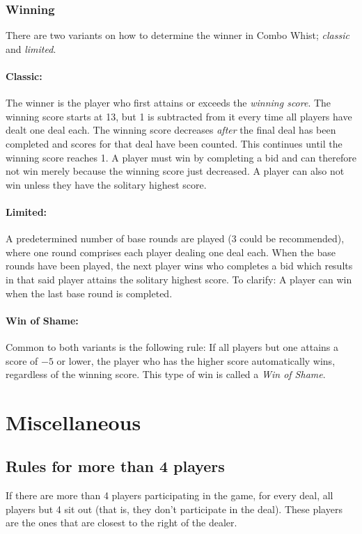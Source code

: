 \documentclass[a4paper]{article}
\begin{document}
			\subsubsection{Winning}
				\label{sec:winning}
				There are two variants on how to determine the winner in Combo Whist; \emph{classic} and \emph{limited}.

				\paragraph{Classic:}
				The winner is the player who first attains or exceeds the \emph{winning score}. The winning score starts at 13, but 1 is subtracted from it every time all players have dealt one deal each. The winning score decreases \emph{after} the final deal has been completed and scores for that deal have been counted. This continues until the winning score reaches 1. A player must win by completing a bid and can therefore not win merely because the winning score just decreased. A player can also not win unless they have the solitary highest score.

				\paragraph{Limited:}
				A predetermined number of base rounds are played (3 could be recommended), where one round comprises each player dealing one deal each. When the base rounds have been played, the next player wins who completes a bid which results in that said player attains the solitary highest score. To clarify: A player can win when the last base round is completed.

				\paragraph{Win of Shame:}
				Common to both variants is the following rule: If all players but one attains a score of $-5$ or lower, the player who has the higher score automatically wins, regardless of the winning score. This type of win is called a \emph{Win of Shame}.

	\section{Miscellaneous}
		\subsection{Rules for more than 4 players}
			If there are more than 4 players participating in the game, for every deal, all players but 4 sit out (that is, they don't participate in the deal). These players are the ones that are closest to the right of the dealer.
		
\end{document}
